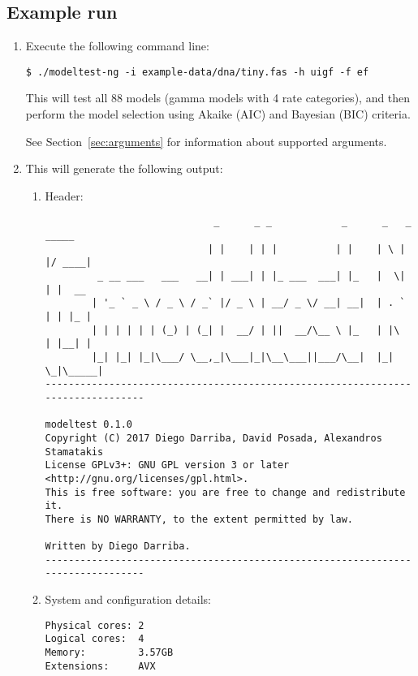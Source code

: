 \subsection{Example run}

\begin{enumerate}
\item Execute the following command line:

\begin{lstlisting}
$ ./modeltest-ng -i example-data/dna/tiny.fas -h uigf -f ef
\end{lstlisting}

This will test all 88 models (gamma models with 4 rate categories), and then perform the model selection using Akaike (AIC) and Bayesian (BIC) criteria.

See Section~\ref{sec:arguments} for information about supported arguments.

\item This will generate the following output:

\begin{enumerate}

\item Header:

\begin{lstlisting}
                             _      _ _            _      _   _  _____ 
                            | |    | | |          | |    | \ | |/ ____|
         _ __ ___   ___   __| | ___| | |_ ___  ___| |_   |  \| | |  __ 
        | '_ ` _ \ / _ \ / _` |/ _ \ | __/ _ \/ __| __|  | . ` | | |_ |
        | | | | | | (_) | (_| |  __/ | ||  __/\__ \ |_   | |\  | |__| |
        |_| |_| |_|\___/ \__,_|\___|_|\__\___||___/\__|  |_| \_|\_____|
--------------------------------------------------------------------------------

modeltest 0.1.0
Copyright (C) 2017 Diego Darriba, David Posada, Alexandros Stamatakis
License GPLv3+: GNU GPL version 3 or later <http://gnu.org/licenses/gpl.html>.
This is free software: you are free to change and redistribute it.
There is NO WARRANTY, to the extent permitted by law.

Written by Diego Darriba.
--------------------------------------------------------------------------------
\end{lstlisting}

\item System and configuration details:

\begin{lstlisting}
Physical cores: 2
Logical cores:  4
Memory:         3.57GB
Extensions:     AVX


\end{lstlisting}
\end{enumerate}
\end{enumerate}
